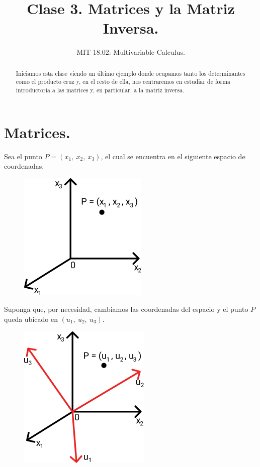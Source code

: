 \documentclass[12pt]{article}
\title{Clase 3. Matrices y la Matriz Inversa.}
\author{MIT 18.02: Multivariable Calculus.}
\date{}
\begin{document}
\maketitle

\begin{abstract}
\noindent Iniciamos esta clase viendo un último ejemplo donde ocupamos tanto los determinantes como el producto cruz y, en el resto de ella, nos centraremos en estudiar de forma introductoria a las matrices y, en particular, a la matriz inversa.
\end{abstract}


\section{Matrices.}

Sea el punto $P = (x_{1}, \ x_{2}, \ x_{3})$, el cual se encuentra en el siguiente espacio de coordenadas.

\begin{figure}[hbt!]
\centering
\includegraphics[scale=0.6]{img/matrices-1.jpg}
\end{figure}

Suponga que, por necesidad, cambiamos las coordenadas del espacio y el punto $P$ queda ubicado en $(u_{1}, \ u_{2}, \ u_{3})$.

\newpage

\begin{figure}[hbt!]
\centering
\includegraphics[scale=0.6]{img/matrices-2.jpg}
\end{figure}
\end{document}
